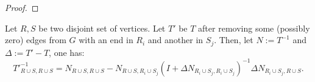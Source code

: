 \begin{proof}
\end{proof}

\begin{theorem}[Update 2]
\label{update:2}
    Let \(R, S\) be two disjoint set of vertices. Let \(T'\) be \(T\) after removing some (possibly zero) edges from \(G\) with an end in \(R_i\) and another in \(S_j\).
    Then, let \(N := T^{-1}\) and \(\Delta := T' - T\), one has:
    \[
        {T'}^{-1}_{R \cup S, R \cup S} = N_{R \cup S, R \cup S} - N_{R \cup S, R_i \cup S_j}(I + \Delta N_{R_i \cup S_j, R_i \cup S_j})^{-1} \Delta N_{R_i \cup S_j, R \cup S}.
    \]
\end{theorem}

